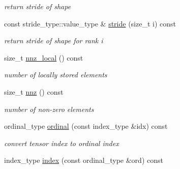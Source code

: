 \begin{DoxyCompactItemize}
\begin{DoxyCompactList}\small\item\em return stride of shape \item\end{DoxyCompactList}\item 
\hypertarget{classbtas_1_1_sp_tensor_ab9459dfb3656ba5f3355d156f70e7237}{
const stride\_\-type::value\_\-type \& \hyperlink{classbtas_1_1_sp_tensor_ab9459dfb3656ba5f3355d156f70e7237}{stride} (size\_\-t i) const }
\label{classbtas_1_1_sp_tensor_ab9459dfb3656ba5f3355d156f70e7237}

\begin{DoxyCompactList}\small\item\em return stride of shape for rank i \item\end{DoxyCompactList}\item 
\hypertarget{classbtas_1_1_sp_tensor_a838f7e257281401320b8687b2358e5b2}{
size\_\-t \hyperlink{classbtas_1_1_sp_tensor_a838f7e257281401320b8687b2358e5b2}{nnz\_\-local} () const }
\label{classbtas_1_1_sp_tensor_a838f7e257281401320b8687b2358e5b2}

\begin{DoxyCompactList}\small\item\em number of locally stored elements \item\end{DoxyCompactList}\item 
\hypertarget{classbtas_1_1_sp_tensor_a9656b227b14c23922ea0254b479dc568}{
size\_\-t \hyperlink{classbtas_1_1_sp_tensor_a9656b227b14c23922ea0254b479dc568}{nnz} () const }
\label{classbtas_1_1_sp_tensor_a9656b227b14c23922ea0254b479dc568}

\begin{DoxyCompactList}\small\item\em number of non-\/zero elements \item\end{DoxyCompactList}\item 
\hypertarget{classbtas_1_1_sp_tensor_ab4675e513d23cf67bc6c7133071d48d3}{
ordinal\_\-type \hyperlink{classbtas_1_1_sp_tensor_ab4675e513d23cf67bc6c7133071d48d3}{ordinal} (const index\_\-type \&idx) const }
\label{classbtas_1_1_sp_tensor_ab4675e513d23cf67bc6c7133071d48d3}

\begin{DoxyCompactList}\small\item\em convert tensor index to ordinal index \item\end{DoxyCompactList}\item 
\hypertarget{classbtas_1_1_sp_tensor_a2b17a61b8fe761cc19a31aeeec58a5d5}{
index\_\-type \hyperlink{classbtas_1_1_sp_tensor_a2b17a61b8fe761cc19a31aeeec58a5d5}{index} (const ordinal\_\-type \&ord) const }
\label{classbtas_1_1_sp_tensor_a2b17a61b8fe761cc19a31aeeec58a5d5}


\end{DoxyCompactItemize}
